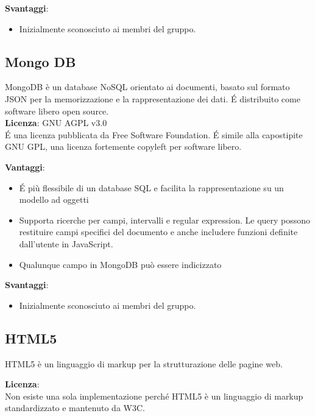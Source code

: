 \textbf{Svantaggi}: %
\begin{itemize}
	\item Inizialmente sconosciuto ai membri del gruppo.
\end{itemize}

\subsection{Mongo DB}
MongoDB è un database NoSQL orientato ai documenti, basato sul formato JSON per la memorizzazione e la rappresentazione dei dati. \'E distribuito come software libero open source. \\

\textbf{Licenza}: GNU AGPL v3.0 \\
\'E una licenza pubblicata da Free Software Foundation. \'E simile alla capostipite GNU GPL, una licenza fortemente copyleft per software libero.

\textbf{Vantaggi}: 
\begin{itemize}
	\item \'E più flessibile di un database SQL e facilita la rappresentazione su un modello ad
	oggetti
	\item Supporta ricerche per campi, intervalli e regular expression. Le query possono restituire campi specifici del documento e anche includere funzioni definite dall'utente in JavaScript.
	\item Qualunque campo in MongoDB può essere indicizzato 
\end{itemize}


\textbf{Svantaggi}: 
\begin{itemize}
	\item Inizialmente sconosciuto ai membri del gruppo.	
\end{itemize}

\subsection{HTML5}
HTML5 è un linguaggio di markup per la strutturazione delle pagine web.

\textbf{Licenza}:  \\
Non esiste una sola implementazione perché HTML5 è un linguaggio di markup standardizzato e mantenuto da W3C.


